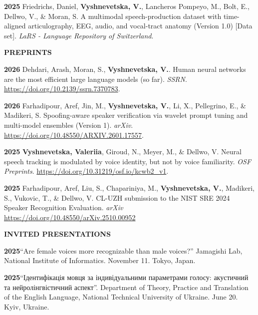 \documentclass[11pt]{article}
\newcommand{\hangpara}{
 \setlength{\parindent}{0in} %
 \hangindent=0.42in %
}
\begin{document}
\vskip 6pt
\hangpara
{\bf 2025}\hspace{1ex} Friedrichs, Daniel, \textbf{Vyshnevetska, V.}, Lancheros Pompeyo, M., Bolt, E., Dellwo, V., \& Moran, S. A multimodal speech-production dataset with time-aligned articulography, EEG, audio, and vocal-tract anatomy (Version 1.0) [Data set]. {\it LaRS - Language Repository of Switzerland}.


\vskip 20pt
\begin{flushleft}
{\bf PREPRINTS}
\end{flushleft}

\vskip 6pt
\hangpara
{\bf 2026}\hspace{1ex} Dehdari, Arash, Moran, S., \textbf{Vyshnevetska, V.}. Human neural networks are the most efficient large language models (so far). \textit{SSRN}. \url{https://doi.org/10.2139/ssrn.7370783}.
\vskip 6pt
\hangpara
{\bf 2026}\hspace{1ex} Farhadipour, Aref, Jin, M., \textbf{Vyshnevetska, V.}, Li, X., Pellegrino, E., \&  Madikeri, S. Spoofing-aware speaker verification via wavelet prompt tuning and multi-model ensembles (Version 1). \textit{arXiv}. \url{https://doi.org/10.48550/ARXIV.2601.17557}.
\vskip 6pt
\hangpara
{\bf 2025}\hspace{1ex} \textbf{Vyshnevetska, Valeriia}, Giroud, N., Meyer, M., \& Dellwo, V. Neural speech tracking is modulated by voice identity, but not by voice familiarity. {\it OSF Preprints}. \url{https://doi.org/10.31219/osf.io/kcwb2_v1}.
\vskip 6pt
\hangpara
{\bf 2025}\hspace{1ex} Farhadipour, Aref, Liu, S., Chapariniya, M., \textbf{Vyshnevetska, V.}, Madikeri, S., Vukovic, T., \& Dellwo, V. CL-UZH submission to the NIST SRE 2024 Speaker Recognition Evaluation. \textit{arXiv}
\url{https://doi.org/10.48550/arXiv.2510.00952}


\vskip 20pt
\begin{flushleft}
{\bf INVITED PRESENTATIONS}
\end{flushleft}

\hangpara
{\bf 2025}\hspace{1ex}“Are female voices more recognizable than male voices?” Jamagishi Lab, National Institute of Informatics. November 11. Tokyo, Japan. 

\vskip 6pt

\hangpara
{\bf 2025}\hspace{1ex}“Ідентифікація мовця за індивідуальними параметрами голосу: акустичний та нейролінгвістичний аспект”. Department of Theory, Practice and Translation of the English Language, National Technical University of Ukraine. June 20. Kyiv, Ukraine. 
\end{document}
